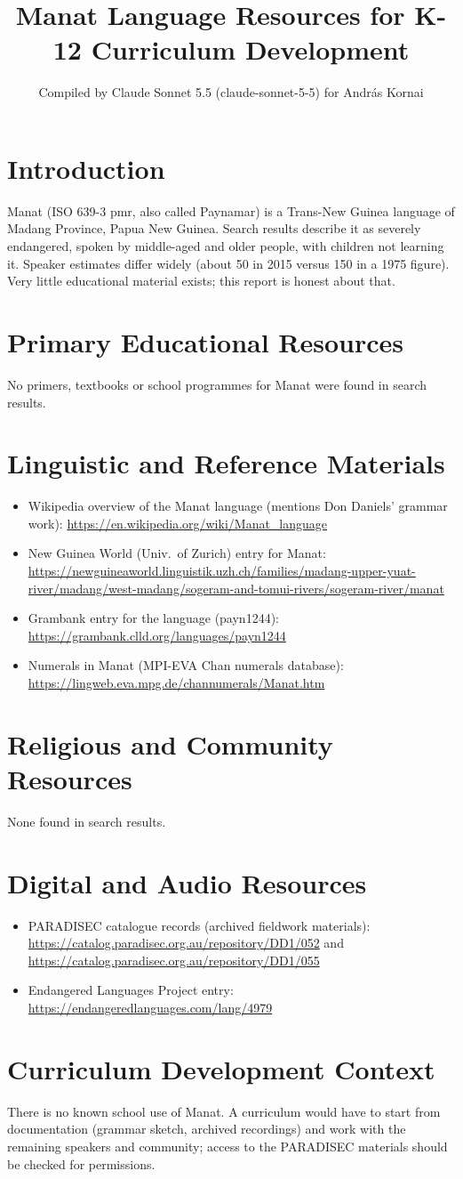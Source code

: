 \documentclass[12pt]{article}
\title{Manat Language Resources for K-12 Curriculum Development}
\author{Compiled by Claude Sonnet 5.5 (claude-sonnet-5-5) for Andr\'as Kornai}
\date{}
\begin{document}
\maketitle
\section{Introduction}
Manat (ISO 639-3 pmr, also called Paynamar) is a Trans-New Guinea language of Madang Province, Papua New Guinea. Search results describe it as severely endangered, spoken by middle-aged and older people, with children not learning it. Speaker estimates differ widely (about 50 in 2015 versus 150 in a 1975 figure). Very little educational material exists; this report is honest about that.
\section{Primary Educational Resources}
No primers, textbooks or school programmes for Manat were found in search results.
\section{Linguistic and Reference Materials}
\begin{itemize}
\item Wikipedia overview of the Manat language (mentions Don Daniels' grammar work): \url{https://en.wikipedia.org/wiki/Manat_language}
\item New Guinea World (Univ.\ of Zurich) entry for Manat: \url{https://newguineaworld.linguistik.uzh.ch/families/madang-upper-yuat-river/madang/west-madang/sogeram-and-tomui-rivers/sogeram-river/manat}
\item Grambank entry for the language (payn1244): \url{https://grambank.clld.org/languages/payn1244}
\item Numerals in Manat (MPI-EVA Chan numerals database): \url{https://lingweb.eva.mpg.de/channumerals/Manat.htm}
\end{itemize}
\section{Religious and Community Resources}
None found in search results.
\section{Digital and Audio Resources}
\begin{itemize}
\item PARADISEC catalogue records (archived fieldwork materials): \url{https://catalog.paradisec.org.au/repository/DD1/052} and \url{https://catalog.paradisec.org.au/repository/DD1/055}
\item Endangered Languages Project entry: \url{https://endangeredlanguages.com/lang/4979}
\end{itemize}
\section{Curriculum Development Context}
There is no known school use of Manat. A curriculum would have to start from documentation (grammar sketch, archived recordings) and work with the remaining speakers and community; access to the PARADISEC materials should be checked for permissions.
\end{document}
